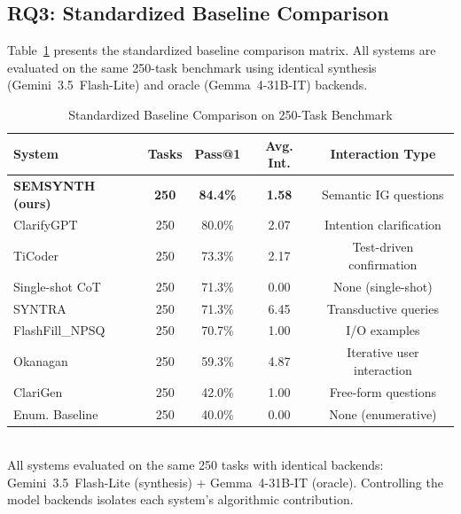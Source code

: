 \documentclass[10pt,conference]{IEEEtran}
\begin{document}
\subsection{RQ3: Standardized Baseline Comparison}

Table~\ref{tab:baseline-comparison} presents the standardized baseline comparison matrix. All systems are evaluated on the same 250-task benchmark using identical synthesis (Gemini~3.5~Flash-Lite) and oracle (Gemma~4-31B-IT) backends.

\begin{table}[htbp]
\centering
\caption{Standardized Baseline Comparison on 250-Task Benchmark}
\label{tab:baseline-comparison}
\footnotesize
\setlength{\tabcolsep}{3pt}
\begin{tabular}{lcccc}
\toprule
\textbf{System} & \textbf{Tasks} & \textbf{Pass@1} & \textbf{Avg. Int.} & \textbf{Interaction Type} \\
\midrule
\textbf{SEMSYNTH (ours)} & \textbf{250} & \textbf{84.4\%} & \textbf{1.58} & Semantic IG questions \\
ClarifyGPT~\cite{clarifygpt} & 250 & 80.0\% & 2.07 & Intention clarification \\
TiCoder~\cite{ticoder} & 250 & 73.3\% & 2.17 & Test-driven confirmation \\
Single-shot CoT~\cite{gpt4} & 250 & 71.3\% & 0.00 & None (single-shot) \\
SYNTRA~\cite{syntra} & 250 & 71.3\% & 6.45 & Transductive queries \\
FlashFill\_NPSQ~\cite{flashfill, npsq} & 250 & 70.7\% & 1.00 & I/O examples \\
Okanagan~\cite{chen2023} & 250 & 59.3\% & 4.87 & Iterative user interaction \\
ClariGen~\cite{clarigen} & 250 & 42.0\% & 1.00 & Free-form questions \\
Enum. Baseline & 250 & 40.0\% & 0.00 & None (enumerative) \\
\bottomrule
\end{tabular}
\\
{\footnotesize All systems evaluated on the same 250 tasks with identical backends: Gemini~3.5~Flash-Lite (synthesis) + Gemma~4-31B-IT (oracle). Controlling the model backends isolates each system's algorithmic contribution.}
\end{table}
\end{document}
